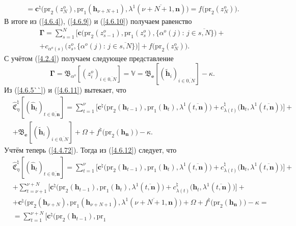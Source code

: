 \documentclass[11pt,twoside]{report}
\newcommand{\bfn}{\begin{equation}}
\newcommand{\efn}{\end{equation}}
\newcommand{\ov}{\overline}
\newcommand{\Om}{\Omega}
\newcommand{\la}{\lambda}
\newcommand{\al}{\alpha}
\newcommand{\zc}{{\mathbf c}}
\newcommand{\nn}{{\mathbf n}}
\begin{document}
{{\begin{eqnarray}
&=\zc^\natural\bigl(\mathrm{pr}_2(z_N^o),\mathrm{pr}_1(\mathbf{h}_{\nu+N+1}),\la^1(\ov{\nu+N+1,\nn})
\bigl) = f\bigl(\mathrm{pr}_2(z_N^o)\bigl).
&\label{4.6.10}
\end{eqnarray}
В итоге из (\ref{4.6.4}), (\ref{4.6.9}) и  (\ref{4.6.10}) получаем равенство
$$
\begin{array}{c}
\mathbf{\Gamma} = \sum\limits_{s=1}^N\bigl[\zc\bigl(\mathrm{pr}_2(z_{s-1}^o),
\mathrm{pr}_1(z_s^o),\{\al^o(j):
\,j\in\ov{s,N}\}\bigl)+
\\
+c_{\al^o(s)}\bigl(z_s^o,\{\al^o(j):\,j\in\ov{s,N}\}\bigl)\bigl]
+f\bigl(\mathrm{pr}_2(z_N^o)\bigl).
\end{array}
$$
С учётом (\ref{4.2.4}) получаем следующее представление
\bfn\label{4.6.11}
\mathbf{\Gamma}= \mathfrak{B}_{\al^o}[(z_i^o)_{i\in\ov{0,N}}] =\mathbb{V}=
\mathfrak{B}_\mathbf{e}[(\tilde{\mathbf{h}}_i)_{i\in\ov{0,N}}] - \kappa.
\efn
Из (\ref{4.6.5``}) и (\ref{4.6.11}) вытекает, что
\begin{eqnarray}
&\widehat{\mathfrak{C}}_\eta^\natural[(\hat{\mathbf{h}}_t)_{t\in\ov{0,\nn}}]=
\sum\limits_{t=1}^\nu\bigl[\zc^\natural\bigl(\mathrm{pr}_2(\mathbf{h}_{t-1}),
\mathrm{pr}_1(\mathbf{h}_t),
\la^1(\ov{t,\nn})\bigl) + c_{\la(t)}^\natural\bigl(\mathbf{h}_t,\la^1(\ov{t,\nn})\bigl)\bigl] +
&\nonumber\\
&+ \mathfrak{B}_\mathbf{e}
[(\tilde{\mathbf{h}}_i)_{i\in\ov{0,N}}] + \Om +
f^\natural\bigl(\mathrm{pr}_2(\mathbf{h}_\nn)\bigl) -\kappa.
&\label{4.6.12}
\end{eqnarray}
Учтём теперь (\ref{4.4.72}). Тогда из (\ref{4.6.12}) следует, что
\begin{eqnarray}
&\widehat{\mathfrak{C}}_\eta^\natural[(\hat{\mathbf{h}}_t)_{t\in\ov{0,\nn}}]=
\sum\limits_{t=1}^\nu\bigl[\zc^\natural\bigl(\mathrm{pr}_2(\mathbf{h}_{t-1}),\mathrm{pr}_1(\mathbf{h}_t),
 \la^1(\ov{t,\nn})\bigl) + c_{\la(t)}^\natural\bigl(\mathbf{h}_t,\la^1(\ov{t,\nn})\bigl)\bigl] +
&\nonumber\\
&+\sum\limits_{t=\nu+1}^{\nu+N}\bigl[\zc^\natural\bigl(\mathrm{pr}_2(\mathbf{h}_{t-1}),\mathrm{pr}_1
(\mathbf{h}_t),\la^1(\ov{t,\nn})\bigl)+ c_{\la(t)}^\natural\bigl(\mathbf{h}_t,\la^1(\ov{t,\nn})\bigl)\bigl] +
&\nonumber\\
&+ \zc^\natural\bigl(\mathrm{pr}_2(\mathbf{h}_{\nu+N}),\mathrm{pr}_1(\mathbf{h}_{\nu+N+1}),
\la^1(\ov{\nu+N+1,\nn})\bigl)+ \Om + f^\natural\bigl(\mathrm{pr}_2(\mathbf{h}_\nn)\bigl) -\kappa =
&\nonumber\\
&= \sum\limits_{t=1}^{\nu+N}\bigl[\zc^\natural\bigl(\mathrm{pr}_2(\mathbf{h}_{t-1}),\mathrm{pr}_1

\end{eqnarray}}}
\end{document}
